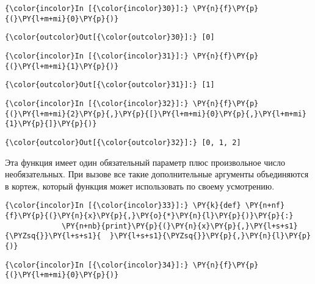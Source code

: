     \begin{Verbatim}[commandchars=\\\{\}]
{\color{incolor}In [{\color{incolor}30}]:} \PY{n}{f}\PY{p}{(}\PY{l+m+mi}{0}\PY{p}{)}
\end{Verbatim}

            \begin{Verbatim}[commandchars=\\\{\}]
{\color{outcolor}Out[{\color{outcolor}30}]:} [0]
\end{Verbatim}
        
    \begin{Verbatim}[commandchars=\\\{\}]
{\color{incolor}In [{\color{incolor}31}]:} \PY{n}{f}\PY{p}{(}\PY{l+m+mi}{1}\PY{p}{)}
\end{Verbatim}

            \begin{Verbatim}[commandchars=\\\{\}]
{\color{outcolor}Out[{\color{outcolor}31}]:} [1]
\end{Verbatim}
        
    \begin{Verbatim}[commandchars=\\\{\}]
{\color{incolor}In [{\color{incolor}32}]:} \PY{n}{f}\PY{p}{(}\PY{l+m+mi}{2}\PY{p}{,}\PY{p}{[}\PY{l+m+mi}{0}\PY{p}{,}\PY{l+m+mi}{1}\PY{p}{]}\PY{p}{)}
\end{Verbatim}

            \begin{Verbatim}[commandchars=\\\{\}]
{\color{outcolor}Out[{\color{outcolor}32}]:} [0, 1, 2]
\end{Verbatim}
        
    Эта функция имеет один обязательный параметр плюс произвольное число
необязательных. При вызове все такие дополнительные аргументы
объединяются в кортеж, который функция может использовать по своему
усмотрению.

    \begin{Verbatim}[commandchars=\\\{\}]
{\color{incolor}In [{\color{incolor}33}]:} \PY{k}{def} \PY{n+nf}{f}\PY{p}{(}\PY{n}{x}\PY{p}{,}\PY{o}{*}\PY{n}{l}\PY{p}{)}\PY{p}{:}
             \PY{n+nb}{print}\PY{p}{(}\PY{n}{x}\PY{p}{,}\PY{l+s+s1}{\PYZsq{}}\PY{l+s+s1}{  }\PY{l+s+s1}{\PYZsq{}}\PY{p}{,}\PY{n}{l}\PY{p}{)}
\end{Verbatim}

    \begin{Verbatim}[commandchars=\\\{\}]
{\color{incolor}In [{\color{incolor}34}]:} \PY{n}{f}\PY{p}{(}\PY{l+m+mi}{0}\PY{p}{)}
\end{Verbatim}

